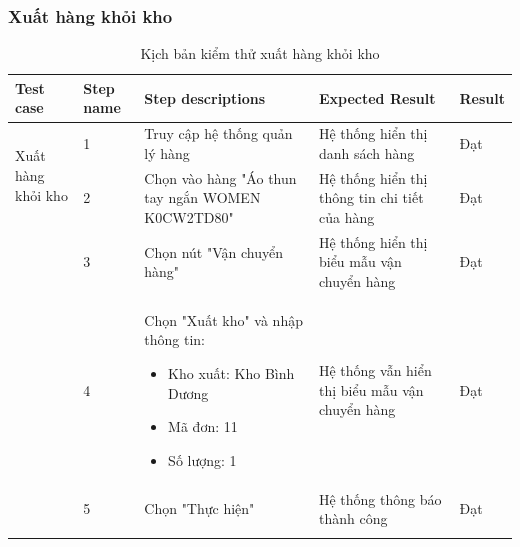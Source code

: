 \subsubsection{Xuất hàng khỏi kho}
{
    \setlength\extrarowheight{6pt}
    \begin{longtable}{| p{2.5cm}| p{1cm}| p{5.5cm}| p{4.5cm} | p{1.5cm} |}
        \hline
        \textbf{Test case}                         & \textbf{Step name}                             & \textbf{Step descriptions}                       & \textbf{Expected Result}                      & \textbf{Result} \\
        \hline
        \multirow[t]{2}{2.5cm}{Xuất hàng khỏi kho} & 1                                              & Truy cập hệ thống quản lý hàng                   & Hệ thống hiển thị danh sách hàng              & Đạt             \\
        \cline{2-5}
                                                   & 2                                              & Chọn vào hàng "Áo thun tay ngắn WOMEN K0CW2TD80" & Hệ thống hiển thị thông tin chi tiết của hàng & Đạt             \\
        \cline{2-5}
                                                   & 3                                              & Chọn nút "Vận chuyển hàng"                       & Hệ thống hiển thị biểu mẫu vận chuyển hàng    & Đạt             \\
        \cline{2-5}
                                                   & 4                                              & Chọn "Xuất kho" và nhập thông tin:
        \begin{itemize}
            \item Kho xuất: Kho Bình Dương
            \item Mã đơn: 11
            \item Số lượng: 1
        \end{itemize}
                                                   & Hệ thống vẫn hiển thị biểu mẫu vận chuyển hàng & Đạt                                                                                                                \\
        \cline{2-5}
                                                   & 5                                              & Chọn "Thực hiện"                                 & Hệ thống thông báo thành công                 & Đạt             \\
        \hline
        \caption{Kịch bản kiểm thử xuất hàng khỏi kho}
    \end{longtable}
}

